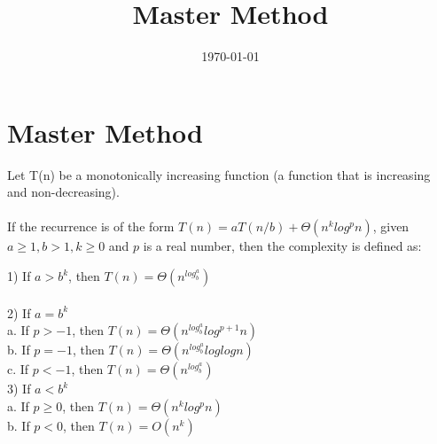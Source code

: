 \documentclass[a4paper, 12pt]{article}
\begin{document}
\title{Master Method}
\date{\today}
\pagestyle{empty} 
\section*{Master Method}
Let T(n) be a monotonically increasing function (a function that is increasing and non-decreasing).\\
	\\
	If the recurrence is of the form $T(n) = aT(n/b) + \Theta(n^k log^p n)$, given $a \geq 1, b > 1, k \geq 0$ and $p$ is a real number, then the complexity is defined as:\\
	
\begin{tabbing}
1) If $a > b^k$, then $T(n) = \Theta(n^{log_b^a})$ \\
\\
2) If $a = b^k$ \=\\
\> a. If $p > -1$, then $T(n) = \Theta(n^{log_b^a} log^{p+1} n)$	\\
\> b. If $p = -1$, then $T(n) = \Theta(n^{log_b^a} log log n)$ \\
\> c. If $p < -1$, then $T(n) = \Theta(n^{log_b^a})$\\
3) If $a < b^k$ \\
\> a. If $p \geq 0$, then $T(n) = \Theta(n^k log^p n)$\\
\> b. If $p < 0$, then $T(n) = O(n^k)$ \\
\end{tabbing}
\end{document}
